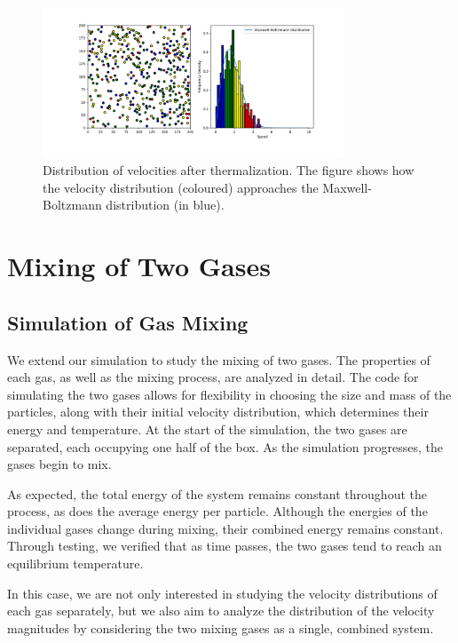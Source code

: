\documentclass{article}
\begin{document}
\begin{figure}[h] %
    \centering
    \includegraphics[width=0.8\textwidth]{Sing_gas_MB.png} %
    \caption{Distribution of velocities after thermalization. The figure shows how the velocity distribution (coloured) approaches the Maxwell-Boltzmann distribution (in blue).}
    \label{fig:velocity_distribution} %
\end{figure}

\section{Mixing of Two Gases}
\subsection{Simulation of Gas Mixing}
We extend our simulation to study the mixing of two gases. The properties of each gas, as well as the mixing process, are analyzed in detail. The code for simulating the two gases allows for flexibility in choosing the size and mass of the particles, along with their initial velocity distribution, which determines their energy and temperature. At the start of the simulation, the two gases are separated, each occupying one half of the box. As the simulation progresses, the gases begin to mix.

As expected, the total energy of the system remains constant throughout the process, as does the average energy per particle. Although the energies of the individual gases change during mixing, their combined energy remains constant. Through testing, we verified that as time passes, the two gases tend to reach an equilibrium temperature.

In this case, we are not only interested in studying the velocity distributions of each gas separately, but we also aim to analyze the distribution of the velocity magnitudes by considering the two mixing gases as a single, combined system.
\end{document}
